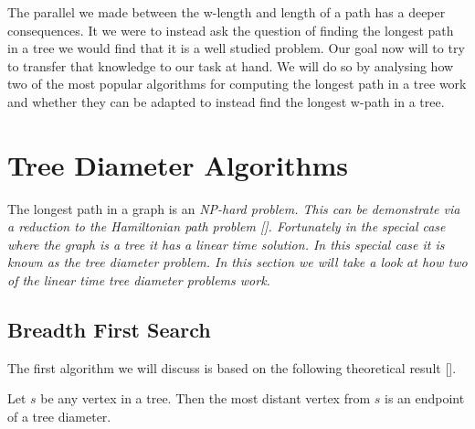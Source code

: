 The parallel we made between the w-length and length of a path has a deeper consequences. It we were to instead ask the question of finding the longest path in a tree we would find that it is a well studied problem. Our goal now will to try to transfer that knowledge to our task at hand. We will do so by analysing how two of the most popular algorithms for computing the longest path in a tree work and whether they can be adapted to instead find the longest w-path in a tree.


\section{Tree Diameter Algorithms}

The longest path in a graph is an \em NP-hard \em problem. This can be demonstrate via a reduction to the Hamiltonian path problem []. Fortunately in the special case where the graph is a tree it has a linear time solution. In this special case it is known as the tree diameter problem. In this section we will take a look at how two of the linear time tree diameter problems work.


\subsection{Breadth First Search}

The first algorithm we will discuss is based on the following theoretical result [].

\begin{lem} Let $s$ be any vertex in a tree. Then the most distant vertex from $s$ is an endpoint of a tree diameter. \end{lem}

